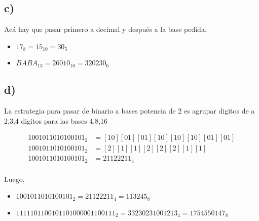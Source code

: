 \subsection*{c)}

Acá hay que pasar primero a decimal y después a la base pedida.

\begin{itemize}
    \item $ 17_8 = 15_{10} = 30_5 $
    \item $ BABA_{13} = 26010_{10} = 320230_6 $
\end{itemize}

\subsection*{d)}

La estrategia para pasar de binario a bases potencia de 2 es agrupar digitos de a 2,3,4 digitos para las bases 4,8,16

\begin{align*}
    1001011010100101_2 &= [10][01][01][10][10][10][01][01] \\
    1001011010100101_2 &= [2][1][1][2][2][2][1][1] \\
    1001011010100101_2 &= 21122211_4 \\
\end{align*}

Luego,
\begin{itemize}
    \item $ 1001011010100101_2 = 21122211_4 = 113245_8 $
    \item $ 1111101100101101000001100111_2 = 33230231001213_4 = 1754550147_8 $
\end{itemize}
